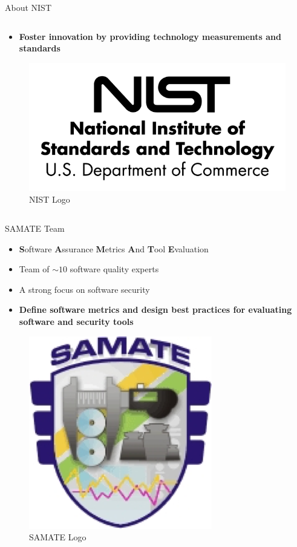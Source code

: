 \documentclass[aspectratio=169]{beamer}
\begin{document}
\begin{frame}{About NIST}
\begin{columns}[t]
\begin{column}{0.71\textwidth}
\begin{small}
\begin{itemize}
        \item \textbf{Foster innovation by providing technology measurements and standards}
        \end{itemize}
        \end{small}
        \begin{figure}
          \centering
          \includegraphics[scale=0.14]{figures/nist-logo}
          \caption{NIST Logo}
        \end{figure}
      \end{column}
    \end{columns}
  \end{frame}

  \begin{frame}{SAMATE Team}
    \begin{itemize}
    \setlength\itemsep{0.7em}
    \item \textbf{S}oftware \textbf{A}ssurance \textbf{M}etrics \textbf{A}nd \textbf{T}ool \textbf{E}valuation
    \item Team of \alert{$\sim10$} software quality experts
    \item A strong focus on software security
    \item \textbf{Define software metrics and design best practices for evaluating software and security tools}
    \end{itemize}
    \begin{figure}
      \centering
      \includegraphics[scale=0.4]{figures/samate-logo}
      \caption{SAMATE Logo}
    \end{figure}
  \end{frame}
\end{document}
